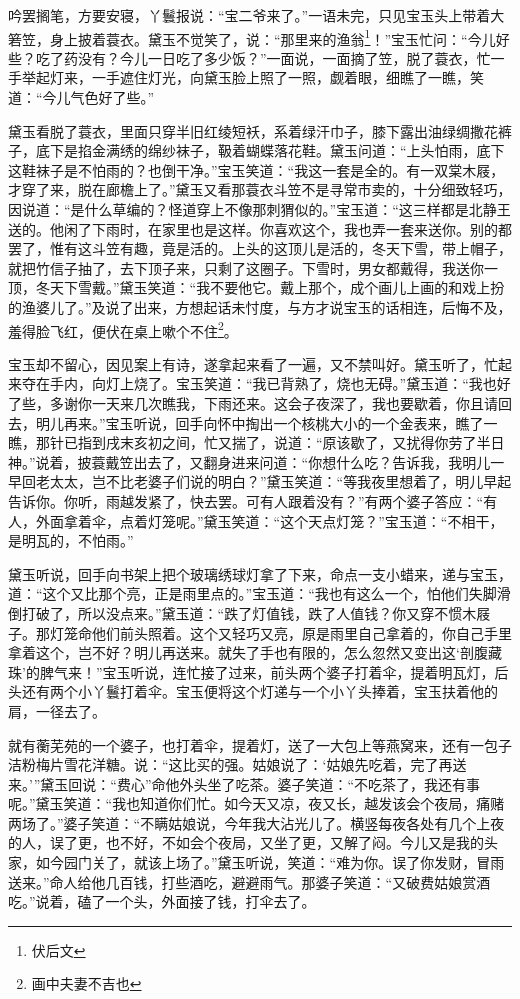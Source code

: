 \documentclass[12pt,oneside]{book}
\begin{document}
吟罢搁笔，方要安寝，丫鬟报说：“宝二爷来了。”一语未完，只见宝玉头上带着大箬笠，身上披着蓑衣。黛玉不觉笑了，说：“那里来的渔翁\footnote{伏后文}！”宝玉忙问：“今儿好些？吃了药没有？今儿一日吃了多少饭？”一面说，一面摘了笠，脱了蓑衣，忙一手举起灯来，一手遮住灯光，向黛玉脸上照了一照，觑着眼，细瞧了一瞧，笑道：“今儿气色好了些。”

黛玉看脱了蓑衣，里面只穿半旧红绫短袄，系着绿汗巾子，膝下露出油绿绸撒花裤子，底下是掐金满绣的绵纱袜子，靸着蝴蝶落花鞋。黛玉问道：“上头怕雨，底下这鞋袜子是不怕雨的？也倒干净。”宝玉笑道：“我这一套是全的。有一双棠木屐，才穿了来，脱在廊檐上了。”黛玉又看那蓑衣斗笠不是寻常市卖的，十分细致轻巧，因说道：“是什么草编的？怪道穿上不像那刺猬似的。”宝玉道：“这三样都是北静王送的。他闲了下雨时，在家里也是这样。你喜欢这个，我也弄一套来送你。别的都罢了，惟有这斗笠有趣，竟是活的。上头的这顶儿是活的，冬天下雪，带上帽子，就把竹信子抽了，去下顶子来，只剩了这圈子。下雪时，男女都戴得，我送你一顶，冬天下雪戴。”黛玉笑道：“我不要他它。戴上那个，成个画儿上画的和戏上扮的渔婆儿了。”及说了出来，方想起话未忖度，与方才说宝玉的话相连，后悔不及，羞得脸飞红，便伏在桌上嗽个不住\footnote{画中夫妻不吉也}。

宝玉却不留心，因见案上有诗，遂拿起来看了一遍，又不禁叫好。黛玉听了，忙起来夺在手内，向灯上烧了。宝玉笑道：“我已背熟了，烧也无碍。”黛玉道：“我也好了些，多谢你一天来几次瞧我，下雨还来。这会子夜深了，我也要歇着，你且请回去，明儿再来。”宝玉听说，回手向怀中掏出一个核桃大小的一个金表来，瞧了一瞧，那针已指到戌末亥初之间，忙又揣了，说道：“原该歇了，又扰得你劳了半日神。”说着，披蓑戴笠出去了，又翻身进来问道：“你想什么吃？告诉我，我明儿一早回老太太，岂不比老婆子们说的明白？”黛玉笑道：“等我夜里想着了，明儿早起告诉你。你听，雨越发紧了，快去罢。可有人跟着没有？”有两个婆子答应：“有人，外面拿着伞，点着灯笼呢。”黛玉笑道：“这个天点灯笼？”宝玉道：“不相干，是明瓦的，不怕雨。”

黛玉听说，回手向书架上把个玻璃绣球灯拿了下来，命点一支小蜡来，递与宝玉，道：“这个又比那个亮，正是雨里点的。”宝玉道：“我也有这么一个，怕他们失脚滑倒打破了，所以没点来。”黛玉道：“跌了灯值钱，跌了人值钱？你又穿不惯木屐子。那灯笼命他们前头照着。这个又轻巧又亮，原是雨里自己拿着的，你自己手里拿着这个，岂不好？明儿再送来。就失了手也有限的，怎么忽然又变出这‘剖腹藏珠’的脾气来！”宝玉听说，连忙接了过来，前头两个婆子打着伞，提着明瓦灯，后头还有两个小丫鬟打着伞。宝玉便将这个灯递与一个小丫头捧着，宝玉扶着他的肩，一径去了。

就有蘅芜苑的一个婆子，也打着伞，提着灯，送了一大包上等燕窝来，还有一包子洁粉梅片雪花洋糖。说：“这比买的强。姑娘说了：‘姑娘先吃着，完了再送来。’”黛玉回说：“费心”命他外头坐了吃茶。婆子笑道：“不吃茶了，我还有事呢。”黛玉笑道：“我也知道你们忙。如今天又凉，夜又长，越发该会个夜局，痛赌两场了。”婆子笑道：“不瞒姑娘说，今年我大沾光儿了。横竖每夜各处有几个上夜的人，误了更，也不好，不如会个夜局，又坐了更，又解了闷。今儿又是我的头家，如今园门关了，就该上场了。”黛玉听说，笑道：“难为你。误了你发财，冒雨送来。”命人给他几百钱，打些酒吃，避避雨气。那婆子笑道：“又破费姑娘赏酒吃。”说着，磕了一个头，外面接了钱，打伞去了。
\end{document}
